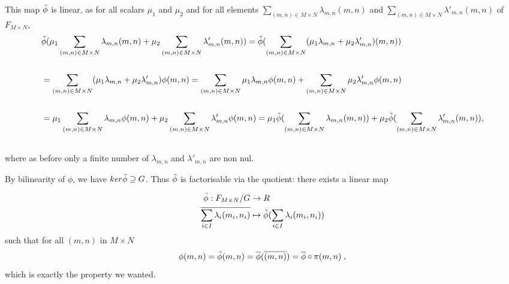 \documentclass{report}
\theoremstyle{definition}
\theoremstyle{remark}
\begin{document}
    
     
    This map $\Tilde{\phi}$ is linear, as for all scalars $\mu_1$ and $\mu_2$ and for all elements $\sum_{(m,n)\in M \times N}\lambda_{m,n} (m,n)$ and $\sum_{(m,n)\in M \times N}\lambda'_{m,n} (m,n)$ of $F_{M \times N}$,
    \begin{equation*}
        \begin{split}
            & \Tilde{\phi} (\mu_1 \sum_{(m,n)\in M \times N} \lambda_{m,n} (m,n) + \mu_2 \sum_{(m,n)\in M \times N} \lambda'_{m,n} (m,n)) = \Tilde{\phi} (\sum_{(m,n)\in M \times N }(\mu_1 \lambda_{m,n} + \mu_2\lambda'_{m,n}) (m,n))\\
            &\\
            &= \sum_{(m,n) \in M \times N} (\mu_1\lambda_{m,n}+\mu_2\lambda'_{m,n})\phi(m,n)  = \sum_{(m,n)\in M \times N} \mu_1 \lambda_{m,n} \phi(m,n) + \sum_{(m,n)\in M \times N} \mu_2 \lambda'_{m,n} \phi(m,n)\\
            &\\
             & = \mu_1 \sum_{(m,n)\in M \times N}\lambda_{m,n} \phi(m,n) + \mu_2 \sum_{(m,n)\in M \times N} \lambda'_{m,n} \phi(m,n)  = \mu_1 \Tilde{\phi}(\sum_{(m,n)\in M \times N}\lambda_{m,n} (m,n)) + \mu_2 \Tilde{\phi} ( \sum_{(m,n)\in M \times N}\lambda'_{m,n} (m,n)), \\
             &\\
            \end{split}
    \end{equation*} where as before only a finite number of $\lambda_{m,n}$ and $\lambda'_{m,n}$ are non nul. 
   
    
    By bilinearity of $\phi$, we have $ker\Tilde{\phi} \supseteq G$. Thus $\Tilde{\phi}$ is factorisable via the quotient: there exists a linear map 
    
    
    \begin{equation*}
        \begin{split}
         \Bar{\phi}: F_{M\times N}/G & \to R \\ 
        \overline{\sum_{i \in I} \lambda_i(m_i,n_i)} & \mapsto \Tilde{\phi}(\sum_{i \in I}\lambda_i (m_i,n_i))
            \end{split}
    \end{equation*}
    such that for all $(m,n)$ in $M \times N$
    $$\phi(m,n) = \Tilde{\phi}(m,n) = \overline{\phi}(\overline{(m,n)}) = \overline{\phi} \circ \pi (m,n)\;,$$
    which is exactly the property we wanted. 
    
\end{document}
